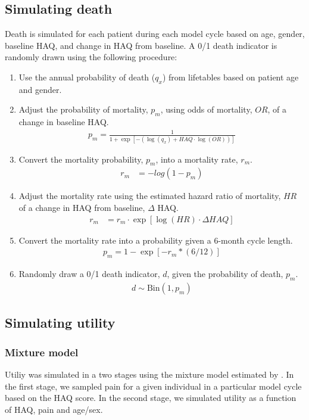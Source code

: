\documentclass[11pt,final,fleqn]{article}\usepackage[]{graphicx}\usepackage[]{color}
\theoremstyle{plain}
\begin{document}
\begin{appendices}
\subsection{Simulating death}\label{ssec:simulating-death}
Death is simulated for each patient during each model cycle based on age, gender, baseline HAQ, and change in HAQ from baseline. A 0/1 death indicator is randomly drawn using the following procedure: 
\begin{enumerate}
\item Use the annual probability of death ($q_x$) from lifetables based on patient age and gender.
\item Adjust the probability of mortality, $p_m$, using odds of mortality, $OR$, of a change in baseline HAQ.
\begin{align}
p_m = \frac{1}{1 + \exp{\left[-(\log(q_x) + HAQ \cdot \log(OR))\right]}}
\end{align}
\item Convert the mortality probability, $p_m$, into a mortality rate, $r_m$.
\begin{align}
r_m &= -log(1 - p_m)
\end{align}
\item Adjust the mortality rate using the estimated hazard ratio of mortality, $HR$ of a change in HAQ from baseline, $\Delta$ HAQ.
\begin{align}
r_m &= r_m \cdot \exp[\log(HR) \cdot \Delta HAQ]
\end{align}
\item Convert the mortality rate into a probability given a 6-month cycle length.
\begin{align}
p_m = 1 - \exp[-r_m * (6/12)]
\end{align}
\item Randomly draw a 0/1 death indicator, $d$, given the probability of death, $p_m$.
\begin{align}
d \sim \text{Bin}(1, p_m)
\end{align}
\end{enumerate}

\subsection{Simulating utility}\label{simulating-utility}
\subsubsection{Mixture model}
Utiliy was simulated in a two stages using the mixture model estimated by \citet{alava2013relationship}. In the first stage, we sampled pain for a given individual in a particular model cycle based on the HAQ score. In the second stage, we simulated utility as a function of HAQ, pain and age/sex.


\end{appendices}
\end{document}
